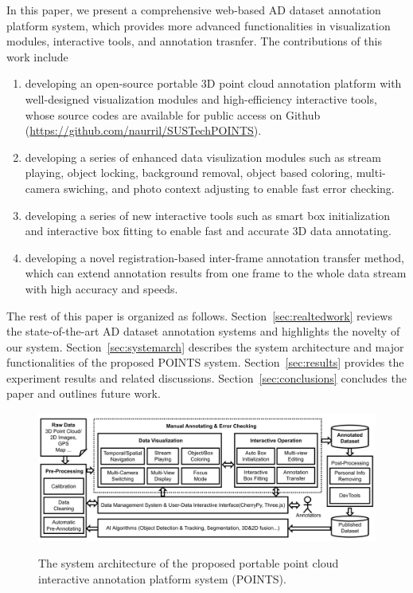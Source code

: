 \documentclass[letterpaper, 10 pt, conference]{ieeeconf}  %
\begin{document}
In this paper, we present a comprehensive web-based AD dataset annotation platform system, which provides more advanced functionalities in visualization modules, interactive tools, and annotation trasnfer. The contributions of this work include
\begin{enumerate}
	\item developing an open-source portable 3D point cloud annotation platform with well-designed visualization modules and high-efficiency interactive tools, whose source codes are available for public access on Github (\url{https://github.com/naurril/SUSTechPOINTS}).
	\item developing a series of enhanced data visulization modules such as stream playing, object locking, background removal, object based coloring, multi-camera
swiching, and photo context adjusting to enable fast error checking.
	\item developing a series of new interactive tools such as smart box initialization and interactive box fitting to enable fast and accurate 3D data annotating.
	\item developing a novel registration-based inter-frame annotation transfer method, which can extend annotation results from one frame to the whole data stream with high accuracy and speeds.

\end{enumerate}



The rest of this paper is organized as follows. 
Section~\ref{sec:realtedwork}  reviews the state-of-the-art AD dataset annotation systems and highlights the novelty of our system. 
Section~\ref{sec:systemarch} describes the system architecture and major functionalities of the proposed POINTS system. 
Section~\ref{sec:results} provides the experiment results and related discussions. 
Section~\ref{sec:conclusions} concludes the paper and outlines future work.





\begin{figure}[t]
	
	\centering
	\vspace{-0.1cm}
	\includegraphics[width=1.0\linewidth]{./arch-big}\\ %
	\caption{The system architecture of the proposed portable point cloud interactive annotation platform system (POINTS).}
	\label{fig:arch_layer}
\end{figure}
\end{document}
